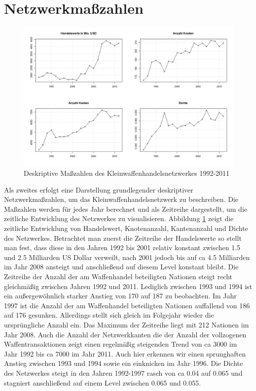 \documentclass[a4paper,ngerman,oneside,titlepage,bibliography=totoc,11pt]{scrreprt}
\begin{document}
\section{Netzwerkmaßzahlen}
\begin{figure}[ht]
	\centering
		\includegraphics[width=1.00\textwidth]{Grafiken/ts_descriptives.png}
	\caption{Deskriptive Maßzahlen des Kleinwaffenhandelsnetzwerkes 1992-2011}
	\label{fig:ts_descriptives}
\end{figure}
Als zweites erfolgt eine Darstellung grundlegender deskriptiver Netzwerkmaßzahlen, um das Kleinwaffenhandelsnetzwerk zu beschreiben. Die Maßzahlen werden für jedes Jahr berechnet und als Zeitreihe dargestellt, um die zeitliche Entwicklung des Netzwerkes zu visualisieren. 
Abbildung \ref{fig:ts_descriptives} zeigt die zeitliche Entwicklung  von Handelswert, Knotenanzahl, Kantenanzahl und Dichte des Netzwerkes. Betrachtet man zuerst die Zeitreihe der Handelswerte so stellt man fest, dass diese in den Jahren 1992 bis 2001 relativ konstant zwischen 1.5 und 2.5 Milliarden US Dollar verweilt, nach 2001 jedoch bis auf ca 4.5 Milliarden im Jahr 2008 ansteigt und anschließend auf diesem Level konstant bleibt.
Die Zeitreihe der Anzahl der am Waffenhandel beteiligten Nationen steigt recht gleichmäßig zwischen Jahren 1992 und 2011. Lediglich zwischen 1993 und 1994 ist ein außergewöhnlich starker Anstieg von 170 auf 187 zu beobachten. Im Jahr 1997 ist die Anzahl der am Waffenhandel beteiligten Nationen auffallend von 186 auf 176 gesunken. Allerdings stellt sich gleich im Folgejahr wieder die ursprüngliche Anzahl ein. Das Maximum der Zeitreihe liegt mit 212 Nationen im Jahr 2008.
Auch die Anzahl der Netzwerkkanten die der Anzahl der vollzogenen Waffentransaktionen zeigt einen regelmäßig steigenden Trend von ca 3000 im Jahr 1992 bis ca 7000 im Jahr 2011. Auch hier erkennen wir einen sprunghaften Anstieg zwischen 1993 und 1994 sowie ein einknicken im Jahr 1996.
Die Dichte des Netzwerkes steigt in den Jahren 1992-1997 rasch von ca 0.04 auf 0.065 und stagniert anschließend auf einem Level zwischen 0.065 und 0.055.
\end{document}
